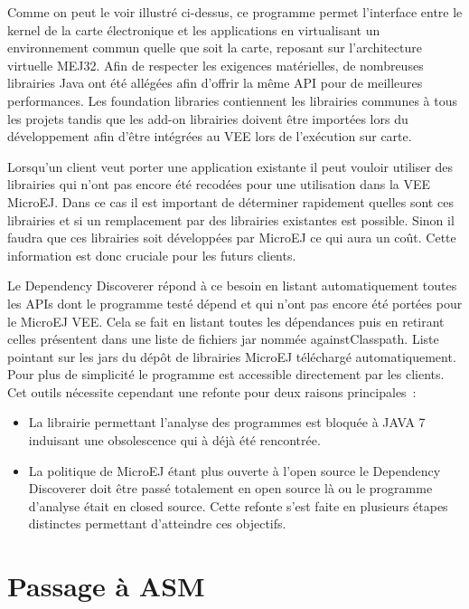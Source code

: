 \documentclass[french,a4paper,12pt]{report}
\begin{document}
Comme on peut le voir illustré ci-dessus, ce programme permet l’interface entre le kernel de la carte électronique et les applications en virtualisant un environnement commun quelle que soit la carte, reposant sur l’architecture virtuelle MEJ32. Afin de respecter les exigences matérielles, de nombreuses librairies Java ont été allégées afin d’offrir la même API pour de meilleures performances. Les foundation libraries contiennent les librairies communes à tous les projets tandis que les add-on librairies doivent être importées lors du développement afin d’être intégrées au VEE lors de l’exécution sur carte.

Lorsqu’un client veut porter une application existante il peut vouloir utiliser des librairies qui n’ont pas encore été recodées pour une utilisation dans la VEE MicroEJ. Dans ce cas il est important de déterminer rapidement quelles sont ces librairies et si un remplacement par des librairies existantes est possible. Sinon il faudra que ces librairies soit développées par MicroEJ ce qui aura un coût. Cette information est donc cruciale pour les futurs clients.
 
Le Dependency Discoverer répond à ce besoin en listant automatiquement toutes les APIs dont le programme testé dépend et qui n’ont pas encore été portées pour le MicroEJ VEE. Cela se fait en listant toutes les dépendances puis en retirant celles présentent dans une liste de fichiers jar nommée againstClasspath. Liste pointant sur les jars du dépôt de librairies MicroEJ téléchargé automatiquement. Pour plus de simplicité le programme est accessible directement par les clients. Cet outils nécessite cependant une refonte pour deux raisons principales :

\begin{itemize}

\item La librairie permettant l’analyse des programmes est bloquée à JAVA 7 induisant une obsolescence qui à déjà été rencontrée.

\item La politique de MicroEJ étant plus ouverte à l’open source le Dependency Discoverer doit être passé totalement en open source là ou le programme d’analyse était en closed source.
Cette refonte s’est faite en plusieurs étapes distinctes permettant d’atteindre ces objectifs.

\end{itemize}

\section{Passage à ASM }
\end{document}
